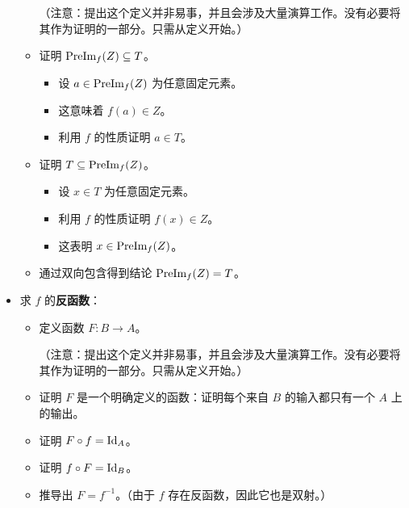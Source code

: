 \begin{itemize}
\begin{itemize}
                    （注意：提出这个定义并非易事，并且会涉及大量演算工作。没有必要将其作为证明的一部分。只需从定义开始。）
              \item 证明 $\text{PreIm}_f(Z) \subseteq T$。
                    \begin{itemize}
                        \item 设 $a \in \text{PreIm}_f(Z)$ 为任意固定元素。
                        \item 这意味着 $f(a) \in Z$。
                        \item 利用 $f$ 的性质证明 $a \in T$。
                    \end{itemize}
              \item 证明 $T \subseteq \text{PreIm}_f(Z)$。
                    \begin{itemize}
                        \item 设 $x \in T$ 为任意固定元素。
                        \item 利用 $f$ 的性质证明 $f(x) \in Z$。
                        \item 这表明 $x \in \text{PreIm}_f(Z)$。
                    \end{itemize}
              \item 通过双向包含得到结论 $\text{PreIm}_f (Z) = T$。
          \end{itemize}
    \item 求 $f$ 的\textbf{反函数}：
          \begin{itemize}
              \item 定义函数 $F: B \to A$。

                    （注意：提出这个定义并非易事，并且会涉及大量演算工作。没有必要将其作为证明的一部分。只需从定义开始。）
              \item 证明 $F$ 是一个明确定义的函数：证明每个来自 $B$ 的输入都只有一个 $A$ 上的输出。
              \item 证明 $F \circ f = \text{Id}_A$。
              \item 证明 $f \circ F = \text{Id}_B$。
              \item 推导出 $F = f^{-1}$。（由于 $f$ 存在反函数，因此它也是双射。）
          \end{itemize}
\end{itemize}
